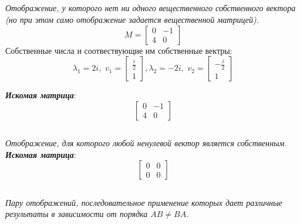 \documentclass[a5paper, 10pt]{article}
\theoremstyle{definition}
\theoremstyle{plain}
\theoremstyle{remark}
\begin{document}
\newpage
\subsection{}
\textit{Отображение, у которого нет ни одного вещественного собственного вектора (но при этом само отображение задается вещественной матрицей).}\\
\begin{equation}
M =
\begin{bmatrix}
0 & -1\\
4 & 0
\end{bmatrix}
\end{equation}
Собственные числа и соотвествующие им собственные вектры:
\begin{equation}
\lambda_1 = 2i, \, \, 
v_1 = 
\begin{bmatrix}
\frac{i}{2}\\
1
\end{bmatrix}
,
\lambda_2 =- 2i, \, \, 
v_2 = 
\begin{bmatrix}
-\frac{i}{2}\\
1
\end{bmatrix}
\end{equation}

\textit{\textbf{Искомая матрица}}:
\begin{equation}
\begin{bmatrix}
0 & -1\\
4 & 0
\end{bmatrix}
\end{equation}


\subsection{}
\textit{Отображение, для которого любой ненулевой вектор является собственным.}\\

\textit{\textbf{Искомая матрица}}:
\begin{equation}
\begin{bmatrix}
0 & 0\\
0 & 0
\end{bmatrix}
\end{equation}


\subsection{}
\textit{Пару отображений, последовательное применение которых дает различные результаты в зависимости от порядка $AB \neq BA$.}\\
\end{document}
